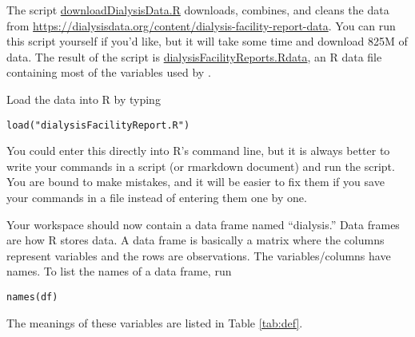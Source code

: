 \documentclass[11pt,reqno,letter]{article}
\renewcommand{\cite}{\citet}
\theoremstyle{definition}
\theoremstyle{problem}
\begin{document}
The script
\href{https://bitbucket.org/paulschrimpf/econ565/src/master/assignments/production-R/dialysis/downloadDialysisData.R}{downloadDialysisData.R}
downloads, combines, and cleans the data from
\url{https://dialysisdata.org/content/dialysis-facility-report-data}. You
can run this script yourself if you'd like, but it will take some time
and download 825M of data. The result of the script is
\href{http://faculty.arts.ubc.ca/pschrimpf/565/dialysisFacilityReports.Rdata}{dialysisFacilityReports.Rdata},
an R data file containing most of the variables used by
\cite{grieco2017}.

Load the data into R by typing
\begin{lstlisting}
load("dialysisFacilityReport.R")
\end{lstlisting}
You could enter this directly into R's command line, but it is always
better to write your commands in a script (or rmarkdown document) and
run the script. You are bound to make mistakes, and it will be easier
to fix them if you save your commands in a file instead of entering
them one by one.

Your workspace should now contain a data frame named ``dialysis.'' Data
frames are how R stores data. A data frame is basically a matrix where
the columns represent variables and the rows are observations. The
variables/columns have names. To list the names of a data frame, run
\begin{lstlisting}
names(df)
\end{lstlisting}
The meanings of these variables are listed in Table \ref{tab:def}.
\end{document}
